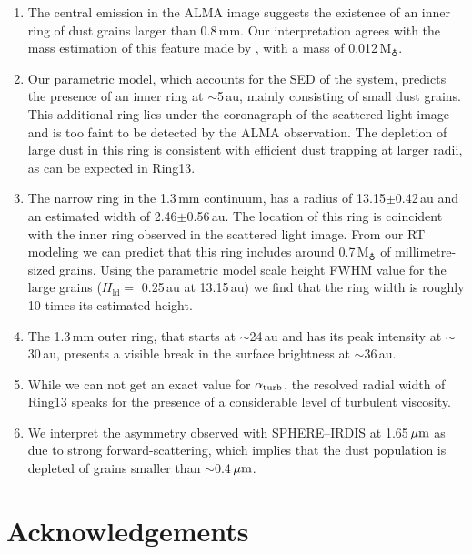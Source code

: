 \documentclass[fleqn,usenatbib,useAMS]{mnras}
\begin{document}
\begin{enumerate}
    \item The central emission in the ALMA image suggests the existence of an inner ring of dust grains larger than 0.8\,mm. Our interpretation agrees with the mass estimation of this feature made by \citet{Francis_2020}, with a mass of 0.012\,M$_{\earth}$.
  
    \item Our parametric model, which accounts for the SED of the system, predicts the presence of an inner ring at $\sim$5\,au, mainly consisting of small dust grains. This additional ring lies under the coronagraph of the scattered light image and is too faint to be detected by the ALMA observation. The depletion of large dust in this ring is consistent with efficient dust trapping at larger radii, as can be expected in Ring13. 
  
    \item The narrow ring in the 1.3\,mm continuum, has a radius of 13.15$\pm$0.42\,au and an estimated width of 2.46$\pm$0.56\,au. The location of this ring is coincident with the inner ring observed in the scattered light image. From our RT modeling we can predict that this ring includes around 0.7\,M$_{\earth}$ of millimetre-sized grains. Using the parametric model scale height FWHM value for the large grains ($H_{\mathrm{ld}}=$ 0.25\,au at 13.15\,au) we find that the ring width is roughly 10 times its estimated height. 
    
    \item The 1.3\,mm outer ring, that starts at $\sim$24\,au and has its peak intensity at $\sim$30\,au, presents a visible break in the surface brightness at $\sim$36\,au.
  
    \item While we can not get an exact value for $\alpha_{\rm turb}$, the resolved radial width of Ring13 speaks for the presence of a considerable level of turbulent viscosity.

    \item We interpret the asymmetry observed with SPHERE--IRDIS at 1.65\,$\hbox{$\mu$m}$ as due to strong forward-scattering, which implies that the dust population is depleted of grains smaller than $\sim$0.4\,$\hbox{$\mu$m}$.
  
\end{enumerate}

\section*{Acknowledgements}
\end{document}
